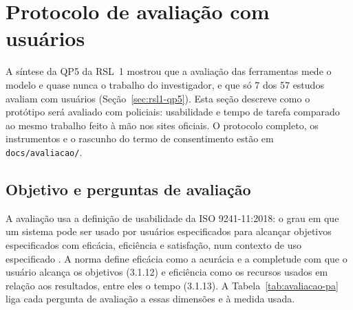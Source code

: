 
\section{Protocolo de avaliação com usuários}
\label{sec:avaliacao-protocolo}

A síntese da QP5 da RSL~1 mostrou que a avaliação das ferramentas mede o
modelo e quase nunca o trabalho do investigador, e que só 7 dos 57 estudos
avaliam com usuários (Seção~\ref{sec:rsl1-qp5}). Esta seção descreve como o
protótipo será avaliado com policiais: usabilidade e tempo de tarefa
comparado ao mesmo trabalho feito à mão nos sites oficiais. O protocolo
completo, os instrumentos e o rascunho do termo de consentimento estão em
\texttt{docs/avaliacao/}.

\subsection{Objetivo e perguntas de avaliação}
\label{sec:avaliacao-objetivo}

A avaliação usa a definição de usabilidade da ISO 9241-11:2018: o grau em
que um sistema pode ser usado por usuários especificados para alcançar
objetivos especificados com eficácia, eficiência e satisfação, num contexto
de uso especificado \cite[3.1.1]{iso9241-11}. A norma define eficácia como a
acurácia e a completude com que o usuário alcança os objetivos (3.1.12) e
eficiência como os recursos usados em relação aos resultados, entre eles o
tempo (3.1.13). A Tabela~\ref{tab:avaliacao-pa} liga cada pergunta de
avaliação a essas dimensões e à medida usada.

